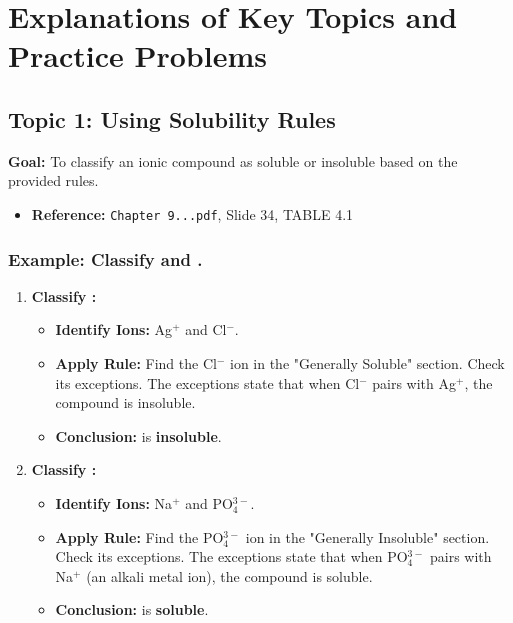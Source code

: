 \documentclass{article}
\begin{document}
\section*{Explanations of Key Topics and Practice Problems}

\subsection*{Topic 1: Using Solubility Rules}
\textbf{Goal:} To classify an ionic compound as soluble or insoluble based on the provided rules.
\begin{itemize}[itemsep=5pt]
    \item \textbf{Reference:} \texttt{Chapter 9...pdf}, Slide 34, TABLE 4.1
\end{itemize}
\subsubsection*{Example: Classify  and .}
\begin{enumerate}[label=\textbf{Step \arabic*:}, itemsep=5pt]
    \item \textbf{Classify :}
    \begin{itemize}
        \item \textbf{Identify Ions:} Ag$^{+}$ and Cl$^{-}$.
        \item \textbf{Apply Rule:} Find the Cl$^{-}$ ion in the "Generally Soluble" section. Check its exceptions. The exceptions state that when Cl$^{-}$ pairs with Ag$^{+}$, the compound is insoluble.
        \item \textbf{Conclusion:}  is \textbf{insoluble}.
    \end{itemize}
    \item \textbf{Classify :}
    \begin{itemize}
        \item \textbf{Identify Ions:} Na$^{+}$ and PO$_4^{3-}$.
        \item \textbf{Apply Rule:} Find the PO$_4^{3-}$ ion in the "Generally Insoluble" section. Check its exceptions. The exceptions state that when PO$_4^{3-}$ pairs with Na$^{+}$ (an alkali metal ion), the compound is soluble.
        \item \textbf{Conclusion:}  is \textbf{soluble}.
    \end{itemize}
\end{enumerate}
\end{document}
